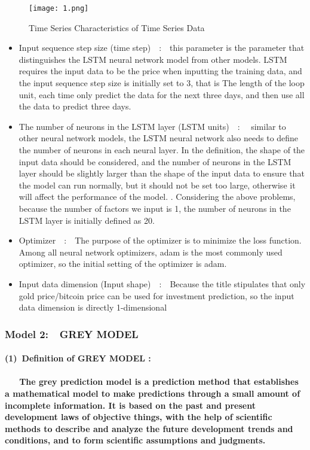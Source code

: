 \documentclass{mcmthesis}
\begin{document}
	\begin{figure}[H]   %
		\centering
		\texttt{[image: 1.png]}
		\caption{Time Series Characteristics of Time Series Data}
		\label{fig:label}
	\end{figure}

	\begin{itemize}
		\item Input sequence step size (time step)\ \ :\ \ this parameter is the parameter that distinguishes the LSTM neural network model from other models. LSTM requires the input data to be the price when inputting the training data, and the input sequence step size is initially set to 3, that is The length of the loop unit, each time only predict the data for the next three days, and then use all the data to predict three days.
		\item The number of neurons in the LSTM layer (LSTM units)\ \ : \ \  similar to other neural network models, the LSTM neural network also needs to define the number of neurons in each neural layer. In the definition, the shape of the input data should be considered, and the number of neurons in the LSTM layer should be slightly larger than the shape of the input data to ensure that the model can run normally, but it should not be set too large, otherwise it will affect the performance of the model. . Considering the above problems, because the number of factors we input is 1, the number of neurons in the LSTM layer is initially defined as 20.
		\item Optimizer\ \ :\ \  The purpose of the optimizer is to minimize the loss function. Among all neural network optimizers, adam is the most commonly used optimizer, so the initial setting of the optimizer is adam.
		\item Input data dimension (Input shape)\ \ :\ \  Because the title stipulates that only gold price/bitcoin price can be used for investment prediction, so the input data dimension is directly 1-dimensional
	\end{itemize}

	\subsubsection{Model 2:\ \ GREY MODEL}
	\paragraph{(1)\ Definition of GREY MODEL : }\cite{GRAY}
	\paragraph{\ \ \ The grey prediction model is a prediction method that establishes a mathematical model to make predictions through a small amount of incomplete information. It is based on the past and present development laws of objective things, with the help of scientific methods to describe and analyze the future development trends and conditions, and to form scientific assumptions and judgments. }
\end{document}
